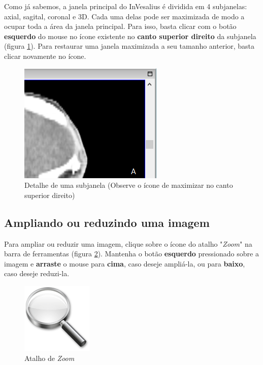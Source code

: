 Como já sabemos, a janela principal do InVesalius é dividida em 4 subjanelas: axial, sagital, coronal
e 3D. Cada uma delas pode ser maximizada de modo a ocupar toda a área da janela principal. Para isso,
basta clicar com o botão \textbf{esquerdo} do mouse no ícone existente no \textbf{canto superior direito}
da subjanela (figura \ref{fig:maximize_window}). Para restaurar uma janela maximizada a seu tamanho
anterior, basta clicar novamente no ícone.

\begin{figure}[!htb]
\centering
\includegraphics[scale=0.6]{../user_guide_figures/invesalius_screen/maximize_sagital_mpr.png}
\caption{Detalhe de uma subjanela (Observe o ícone de maximizar no canto superior direito)}
\label{fig:maximize_window}
\end{figure}

\subsection{Ampliando ou reduzindo uma imagem}

Para ampliar ou reduzir uma imagem, clique sobre o ícone do atalho "\textit{Zoom}" na barra de
ferramentas (figura \ref{fig:zoom_icon}). Mantenha o botão \textbf{esquerdo} pressionado sobre
a imagem e \textbf{arraste} o mouse para \textbf{cima}, caso deseje ampliá-la, ou para \textbf{baixo},
caso deseje reduzi-la.

\begin{figure}[!htb]
\centering
\includegraphics[scale=0.25]{../user_guide_figures/icons/tool_zoom_original.png}
\caption{Atalho de \textit{Zoom}}
\label{fig:zoom_icon}
\end{figure}

